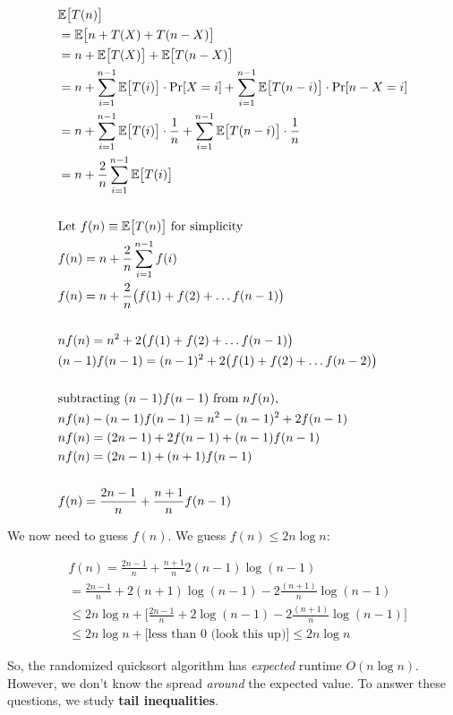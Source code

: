 \begin{align*}
&\E{T(n)} \\
&= \E{n + T(X) + T(n - X)} \\
&= n + \E{T(X)} + \E{T(n - X)} \\
&= n +  \sum_{i = 1}^{n - 1} \E{T(i)} \cdot \Pr[X = i] + \sum_{i = 1}^{n - 1} \E{T(n - i)} \cdot \Pr[n - X = i] \\
&= n + \sum_{i = 1}^{n - 1} \E{T(i)} \cdot \frac{1}{n} + \sum_{i = 1}^{n - 1} \E{T(n - i)} \cdot \frac{1}{n} \\
&= n + \frac{2}{n} \sum_{i = 1}^{n - 1} \E{T(i)} \\
%
\\
&\text{Let $f(n) \equiv \E{T(n)}$ for simplicity} \\
&f(n) = n + \frac{2}{n}\sum_{i = 1}^{n - 1} f(i) \\
&f(n) = n + \frac{2}{n}\big(f(1) + f(2) + \dots f(n - 1) \big) \\
%
\\
& n f(n) = n^2 + 2\big(f(1) + f(2) + \dots f(n - 1) \big) \\
& (n - 1) f(n - 1) = (n - 1)^2 + 2\big(f(1) + f(2) + \dots f(n - 2) \big) \\
%
\\
&\text{subtracting $(n - 1)f(n - 1)$ from $nf(n)$,} \\
&nf(n) - (n - 1) f(n - 1) = n^2 - (n - 1)^2 + 2f (n - 1) \\
&nf(n)= (2n - 1) + 2f (n - 1) + (n - 1) f(n - 1) \\
&nf(n)= (2n - 1) +(n + 1) f(n - 1) \\
%
\\
&f(n)= \frac{2n - 1}{n} + \frac{n + 1}{n} f(n - 1) \\
\end{align*}

We now need to guess $f(n)$. We guess $f(n) \leq 2 n \log n$:

\begin{align*}
	&f(n) = \frac{2n - 1}{n} + \frac{n + 1}{n}2(n - 1)\log(n - 1) \\
	& = \frac{2n - 1}{n} + 2(n + 1) \log(n - 1) - 2\frac{(n + 1)}{n} \log(n - 1) \\
	&\leq 2n \log n + \bigg[ \frac{2n - 1}{n} + 2\log(n - 1) - 2\frac{(n + 1)}{n} \log(n - 1) \bigg] \\
	&\leq 2n \log n + \bigg[\text{less than 0 (look this up)} \bigg] \leq 2n \log n
\end{align*}

So, the randomized quicksort algorithm has \textit{expected} runtime $O(n \log n)$. However,
we don't know the spread \textit{around} the expected value. To answer these questions,
we study \textbf{tail inequalities}.

